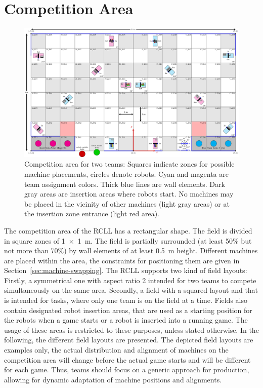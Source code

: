 \documentclass[12pt,twoside]{article}
\newcommand{\refsec}[1]{Section~\ref{#1}}
\begin{document}
\section{Competition Area} \label{sec:area}
\begin{figure}[p]
    \includegraphics[width=\paperwidth, angle=-90, trim=0 0 0 0,]{field2022.pdf}
    \vspace{1ex}
    \caption{%
      Competition area for two teams: Squares indicate zones for possible
      machine placements, circles denote robots. Cyan and magenta are
      team assignment colors. Thick blue lines are wall elements.
      Dark gray areas are insertion areas where robots start. No machines may
      be placed in the vicinity of other machines (light gray areas) or at
      the insertion zone entrance (light red area).
    }
    \label{fig:competition-area}
\end{figure}
The competition area of the RCLL has a rectangular shape. The field is
divided in square zones of \SI{1 x 1}{\metre}. %
The field is partially surrounded (at least 50\% but not more than 70\%)
by wall elements of at least \SI{0.5}{\metre} height.
Different machines are placed within the area, the constraints for
positioning them are given in \refsec{sec:machine-swapping}.
The RCLL supports two kind of field layouts:
Firstly, a symmetrical one
with aspect ratio 2 intended for two teams to compete simultaneously
on the same area.
Secondly, a field with a squared layout and that is intended for tasks,
where only one team is on the field at a time.
Fields also contain designated robot insertion areas, that are used as a
starting position for the robots when a game starts or a robot is inserted
into a running game. The usage of these areas is restricted to these purposes,
unless stated otherwise.
In the following, the different field layouts are presented.
The depicted field layouts are examples only, the actual
distribution and alignment of machines on the competition area will change
before the actual game starts and will be different for each game. Thus, teams
should focus on a generic approach for production, allowing for
dynamic adaptation of machine positions and alignments.
\end{document}
